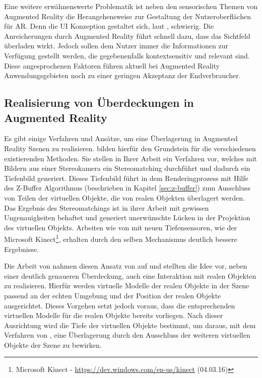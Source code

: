 Eine weitere erwähnenswerte Problematik ist neben den sensorischen Themen von Augmented Reality die Herangehensweise zur Gestaltung der Nutzeroberflächen für AR. Denn die UI Konzeption gestaltet sich, laut \citet{azuma2001recent}, schwierig. Die Anreicherungen durch Augmented Reality führt schnell dazu, dass das Sichtfeld überladen wirkt. Jedoch sollen dem Nutzer immer die Informationen zur Verfügung gestellt werden, die gegebenenfalls kontextsensitiv und relevant sind. Diese angesprochenen Faktoren führen aktuell bei Augmented Reality Anwendungsgebieten noch zu einer geringen Akzeptanz der Endverbraucher.

\subsection{Realisierung von Über\-deckungen in  Augmented Reality} \label{sec:ar-occlusion}

Es gibt einige Verfahren und Ansätze, um eine Überlagerung in Augmented Reality Szenen zu realisieren. \citet{wloka1995resolving} bilden hierfür den Grundstein für die verschiedenen existierenden Methoden. Sie stellen in Ihrer Arbeit ein Verfahren vor, welches mit Bildern aus einer Stereokamera ein Stereomatching durchführt und dadurch ein Tiefenbild generiert. Dieses Tiefenbild führt in dem Renderingprozess mit Hilfe des Z-Buffer Algorithmus (beschrieben in Kapitel \ref{sec:z-buffer}) zum Ausschluss von Teilen der virtuellen Objekte, die von realen Objekten überlagert werden. Das Ergebnis des Stereomatchings ist in ihrer Arbeit mit gewissen Ungenauigkeiten behaftet und generiert unerwünschte Lücken in der Projektion des virtuellen Objekts. Arbeiten wie von \citet{seo2013direct} mit neuen Tiefensensoren, wie der Microsoft Kinect\footnote{Microsoft Kinect - \url{https://dev.windows.com/en-us/kinect} (04.03.16)}, erhalten durch den selben Mechanismus deutlich bessere Ergebnisse. 

Die Arbeit von \citet{breen1996interactive} nahmen diesen Ansatz von \citet{wloka1995resolving} auf und stellten die Idee vor, neben einer deutlich genaueren Überdeckung, auch eine Interaktion mit realen Objekten zu realisieren. Hierfür werden virtuelle Modelle der realen Objekte in der Szene passend an der echten Umgebung und der Position der realen Objekte ausgerichtet. Dieses Vorgehen setzt jedoch voraus, dass die entsprechenden virtuellen Modelle für die realen Objekte bereits vorliegen. Nach dieser Ausrichtung wird die Tiefe der virtuellen Objekte bestimmt, um daraus, mit dem Verfahren von \citet{wloka1995resolving}, eine Überlagerung durch den Ausschluss der weiteren virtuellen Objekte der Szene zu bewirken. 

